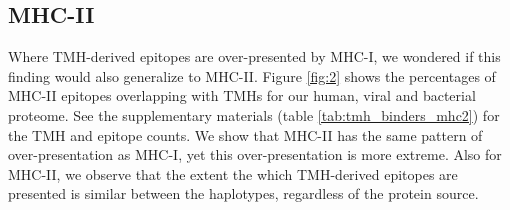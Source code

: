 \subsection{MHC-II}

Where TMH-derived epitopes are over-presented by MHC-I,
we wondered if this finding would also generalize to MHC-II.
Figure \ref{fig:2} shows the percentages of MHC-II epitopes overlapping 
with TMHs for our human, viral and bacterial proteome.
See the supplementary materials (table \ref{tab:tmh_binders_mhc2}) 
for the TMH and epitope counts.
We show that MHC-II has the same pattern of over-presentation
as MHC-I, yet this over-presentation is more extreme.
Also for MHC-II, we observe that the extent the which TMH-derived
epitopes are presented is similar between the haplotypes, regardless
of the protein source.

